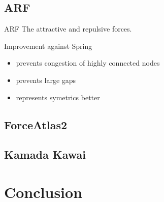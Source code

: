 \documentclass[11pt]{beamer}
\begin{document}
\begin{frame}{\subsecname}
    \resizebox{0.8\textwidth}{!}{}
\end{frame}

\subsection{ARF}
\begin{frame}{\subsecname}

    \begin{block}{ARF}
        The attractive and repulsive forces.
    \end{block}

    \pause
    \begin{block}{Improvement against Spring}
        \begin{itemize}
            \pause
            \item prevents congestion of highly connected nodes
            \pause
            \item prevents large gaps
            \pause
            \item represents symetrics better
        \end{itemize}
    \end{block}

\end{frame}

\begin{frame}{\subsecname}
    \resizebox{0.8\textwidth}{!}{}
\end{frame}

\subsection{ForceAtlas2}
\begin{frame}{\subsecname}


\end{frame}

\begin{frame}{\subsecname}
    \resizebox{0.8\textwidth}{!}{}
\end{frame}

\subsection{Kamada Kawai}
\begin{frame}{\subsecname}
\end{frame}

\begin{frame}{\subsecname}
    \resizebox{0.8\textwidth}{!}{}
\end{frame}

\section{Conclusion}

\end{document}
